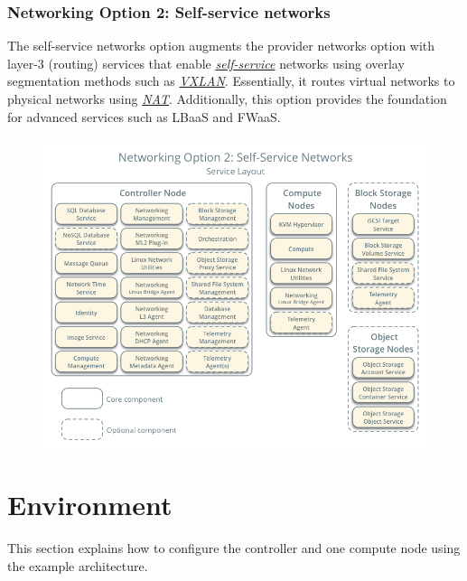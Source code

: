 \documentclass[letterpaper,10pt,english]{sphinxmanual}
\begin{document}
\subsubsection{Networking Option 2: Self-service networks}
\label{_source/installation_guide/overview:networking-option-2-self-service-networks}\label{_source/installation_guide/overview:network2}
The self-service networks option augments the provider networks option
with layer-3 (routing) services that enable
{\hyperref[_source/glossary:term-self-service]{\emph{self-service}}} networks using overlay segmentation methods such
as {\hyperref[_source/glossary:term-vxlan]{\emph{VXLAN}}}. Essentially, it routes virtual networks to physical networks
using {\hyperref[_source/glossary:term-nat]{\emph{NAT}}}. Additionally, this option provides the foundation
for advanced services such as LBaaS and FWaaS.
\begin{figure}[htbp]
\centering

\includegraphics{network2-services.png}
\label{_source/installation_guide/overview:figure-network2-services}\end{figure}


\section{Environment}
\label{_source/installation_guide/environment:environment}\label{_source/installation_guide/environment::doc}\label{_source/installation_guide/environment:id1}
This section explains how to configure the controller and one compute
node using the example architecture.
\end{document}
